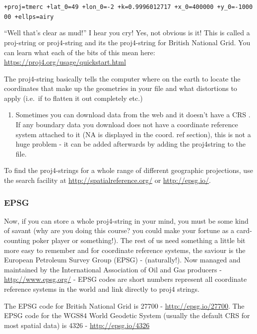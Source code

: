 \documentclass[]{book}
\providecommand{\tightlist}{%
  \setlength{\itemsep}{0pt}\setlength{\parskip}{0pt}}
\begin{document}
\texttt{+proj=tmerc\ +lat\_0=49\ +lon\_0=-2\ +k=0.9996012717\ +x\_0=400000\ +y\_0=-100000\ +ellps=airy}

``Well that's clear as mud!'' I hear you cry! Yes, not obvious is it! This is called a proj-string or proj4-string and its the proj4-string for British National Grid. You can learn what each of the bits of this mean here: \url{https://proj4.org/usage/quickstart.html}

The proj4-string basically tells the computer where on the earth to locate the coordinates that make up the geometries in your file and what distortions to apply (i.e.~if to flatten it out completely etc.)

\begin{enumerate}
\def\labelenumi{\arabic{enumi}.}
\setcounter{enumi}{23}
\tightlist
\item
  Sometimes you can download data from the web and it doesn't have a CRS . If any boundary data you download does not have a coordinate reference system attached to it (NA is displayed in the coord. ref section), this is not a huge problem - it can be added afterwards by adding the proj4string to the file.
\end{enumerate}

To find the proj4-strings for a whole range of different geographic projections, use the search facility at \url{http://spatialreference.org/} or \url{http://epsg.io/}.

\hypertarget{epsg}{%
\subsubsection{EPSG}\label{epsg}}

Now, if you can store a whole proj4-string in your mind, you must be some kind of savant (why are you doing this course? you could make your fortune as a card-counting poker player or something!). The rest of us need something a little bit more easy to remember and for coordinate reference systems, the saviour is the European Petroleum Survey Group (EPSG) - (naturally!). Now managed and maintained by the International Association of Oil and Gas producers - \url{http://www.epsg.org/} - EPSG codes are short numbers represent all coordinate reference systems in the world and link directly to proj4 strings.

The EPSG code for British National Grid is 27700 - \url{http://epsg.io/27700}. The EPSG code for the WGS84 World Geodetic System (usually the default CRS for most spatial data) is 4326 - \url{http://epsg.io/4326}
\end{document}
